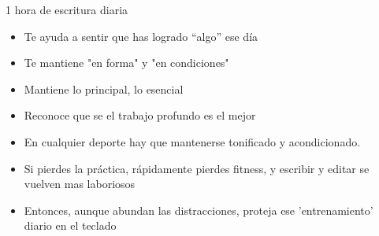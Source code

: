 \documentclass[
10pt,
aspectratio=169,
]{beamer}
\begin{document}
\begin{frame}{1 hora de escritura diaria}
\begin{itemize}
\item Te ayuda a sentir que has logrado “algo” ese día
\item Te mantiene "en forma" y "en condiciones"
\item Mantiene lo principal, lo esencial
\item Reconoce que se el trabajo profundo es el mejor
\item En cualquier deporte hay que mantenerse tonificado y acondicionado.
\item Si pierdes la práctica, rápidamente pierdes fitness, y escribir y editar se vuelven mas laboriosos
\item Entonces, aunque abundan las distracciones, proteja ese 'entrenamiento' diario en el teclado
\end{itemize}
\end{frame}
\end{document}
